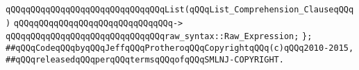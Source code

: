\verb|qQQqqQQqqQQqqQQqqQQqqQQqqQQqqQQqList(qQQqList_Comprehension_ClauseqQQq)|\newline
\verb|qQQqqQQqqQQqqQQqqQQqqQQqqQQqqQQq->|\newline
\verb|qQQqqQQqqQQqqQQqqQQqqQQqqQQqqQQqraw_syntax::Raw_Expression;|\newline
\newline
\verb|};|\newline
\newline
\newline
\verb|##qQQqCodeqQQqbyqQQqJeffqQQqProtheroqQQqCopyrightqQQq(c)qQQq2010-2015,|\newline
\verb|##qQQqreleasedqQQqperqQQqtermsqQQqofqQQqSMLNJ-COPYRIGHT.|\newline

